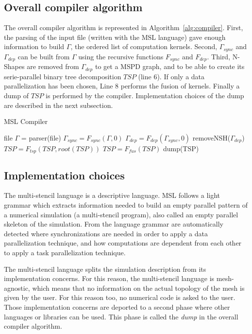 \subsection{Overall compiler algorithm}

The overall compiler algorithm is represented in Algorithm~\ref{alg:compiler}. First, the parsing of the input file (written with the MSL language) gave enough information to build $\Gamma$, the ordered list of computation kernels. Second, $\Gamma_{sync}$ and $\Gamma_{dep}$ can be built from $\Gamma$ using the recursive functions $F_{sync}$ and $F_{dep}$. Third, N-Shapes are removed from $\Gamma_{dep}$ to get a MSPD graph, and to be able to create its serie-parallel binary tree decomposition $TSP$ (line 6). If only a data parallelization has been chosen, Line 8 performs the fusion of kernels. Finally a dump of $TSP$ is performed by the compiler. Implementation choices of the dump are described in the next subsection.

\begin{algorithm}
\caption{MSL Compiler}
\label{alg:compiler}
\begin{algorithmic}[1]
 {file}
\State $\Gamma$ = parser(file)
\State $\Gamma_{sync} = F_{sync}(\Gamma,0)$
\State $\Gamma_{dep} = F_{dep}(\Gamma_{sync},0)$
\State removeNSH($\Gamma_{dep}$)
\State $TSP = F_{tsp}(TSP,root(TSP))$
\State $TSP = F_{fus}(TSP)$
\EndIf
\State dump(TSP)
\EndProcedure
\end{algorithmic}
\end{algorithm}

\subsection{Implementation choices}

The multi-stencil language is a descriptive language. MSL follows a light grammar which extracts information needed to build an empty parallel pattern of a numerical simulation (a multi-stencil program), also called an empty parallel skeleton of the simulation. From the language grammar are automatically detected where synchronizations are needed in order to apply a data parallelization technique, and how computations are dependent from each other to apply a task parallelization technique.

The multi-stencil language splits the simulation description from its implementation concerns. For this reason, the multi-stencil language is mesh-agnostic, which means that no information on the actual topology of the mesh is given by the user. For this reason too, no numerical code is asked to the user. Those implementation concerns are deported to a second phase where other languages or libraries can be used. This phase is called the \emph{dump} in the overall compiler algorithm.

